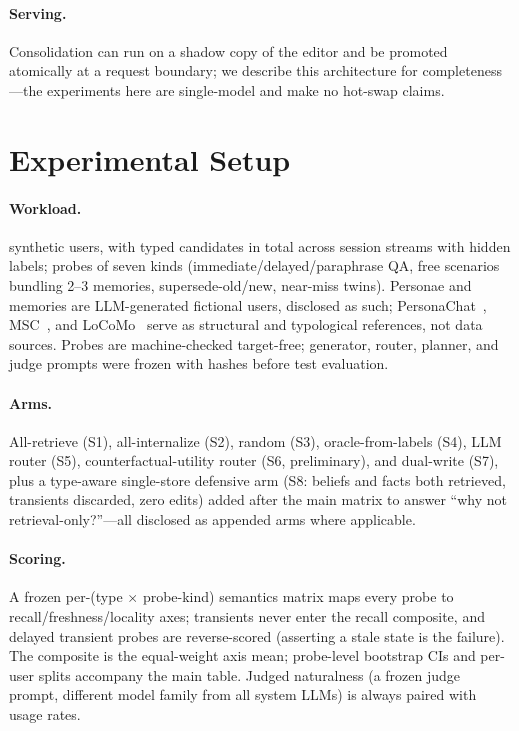 \documentclass{article}
\begin{document}
\paragraph{Serving.} Consolidation can run on a shadow copy of the editor and be promoted atomically at a request boundary; we describe this architecture for completeness---the experiments here are single-model and make no hot-swap claims.

\section{Experimental Setup}
\label{sec:setup}

\paragraph{Workload.} \TestUsers{} synthetic users, with \TestMemories{} typed candidates in total across session streams with hidden labels; \TestProbes{} probes of seven kinds (immediate/delayed/paraphrase QA, free scenarios bundling 2--3 memories, supersede-old/new, near-miss twins). Personae and memories are LLM-generated fictional users, disclosed as such; PersonaChat~\citep{zhang2018personachat}, MSC~\citep{xu2022msc}, and LoCoMo~\citep{maharana2024locomo} serve as structural and typological references, not data sources. Probes are machine-checked target-free; generator, router, planner, and judge prompts were frozen with hashes before test evaluation.

\paragraph{Arms.} All-retrieve (S1), all-internalize (S2), random (S3), oracle-from-labels (S4), LLM router (S5), counterfactual-utility router (S6, preliminary), and dual-write (S7), plus a type-aware single-store defensive arm (S8: beliefs and facts both retrieved, transients discarded, zero edits) added after the main matrix to answer ``why not retrieval-only?''---all disclosed as appended arms where applicable.

\paragraph{Scoring.} A frozen per-(type $\times$ probe-kind) semantics matrix maps every probe to recall/freshness/locality axes; transients never enter the recall composite, and delayed transient probes are reverse-scored (asserting a stale state is the failure). The composite is the equal-weight axis mean; probe-level bootstrap CIs and per-user splits accompany the main table. Judged naturalness (a frozen judge prompt, different model family from all system LLMs) is always paired with usage rates.
\end{document}
